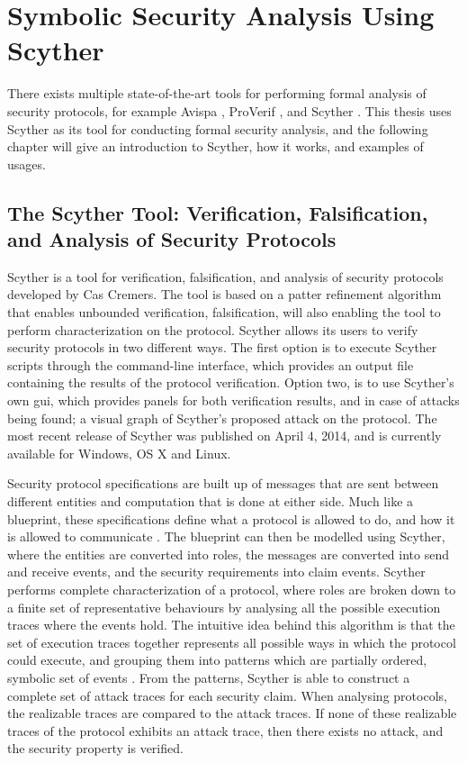 \chapter{Symbolic Security Analysis Using Scyther}
\label{chp:scyther} 


There exists multiple state-of-the-art tools for performing formal analysis of security protocols, for example Avispa \cite{avispa}, ProVerif \cite{proverif}, and Scyther \cite{scyther}. This thesis uses Scyther as its tool for conducting formal security analysis, and the following chapter will give an introduction to Scyther, how it works, and examples of usages.


\section{The Scyther Tool: Verification, Falsification, and Analysis of Security Protocols}

Scyther is a tool for verification, falsification, and analysis of security protocols developed by Cas Cremers. The tool is based on a patter refinement algorithm that enables unbounded verification, falsification, will also enabling the tool to perform characterization \cite{cremers2008scyther} on the protocol. Scyther allows its users to verify security protocols in two different ways. The first option is to execute Scyther scripts through the command-line interface, which provides an output file containing the results of the protocol verification. Option two, is to use Scyther's own \gls{gui}, which provides panels for both verification results, and in case of attacks being found; a visual graph of Scyther's proposed attack on the protocol. The most recent release of Scyther was published on April 4, 2014, and is currently available for Windows, OS X and Linux.


Security protocol specifications are built up of messages that are sent between different entities and computation that is done at either side. Much like a blueprint, these specifications define what a protocol is allowed to do, and how it is allowed to communicate \cite{cremers2003defining}. The blueprint can then be modelled using Scyther, where the entities are converted into roles, the messages are converted into send and receive events, and the security requirements into claim events. Scyther performs complete characterization of a protocol, where roles are broken down to a finite set of representative behaviours by analysing all the possible execution traces where the events hold. The intuitive idea behind this algorithm is that the set of execution traces together represents all possible ways in which the protocol could execute, and grouping them into patterns which are partially ordered, symbolic set of events  \cite{cremers2006scyther}. From the patterns, Scyther is able to construct a complete set of attack traces for each security claim. When analysing protocols, the realizable traces are compared to the attack traces. If none of these realizable traces of the protocol exhibits an attack trace, then there exists no attack, and the security property is verified. 


